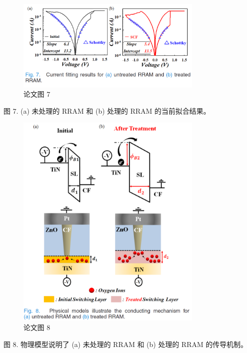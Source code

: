 \begin{figure}[htb]
\centering 
\includegraphics[width=0.80\textwidth]{img/c1m7.png} 
\caption{论文图 7}
\label{Test}
\end{figure}
图 7. (a) 未处理的 RRAM 和 (b) 处理的 RRAM 的当前拟合结果。

\begin{figure}[htb]
\centering 
\includegraphics[width=0.80\textwidth]{img/c1m8.png} 
\caption{论文图 8}
\label{Test}
\end{figure}
图 8. 物理模型说明了 (a) 未处理的 RRAM 和 (b) 处理的 RRAM 的传导机制。



